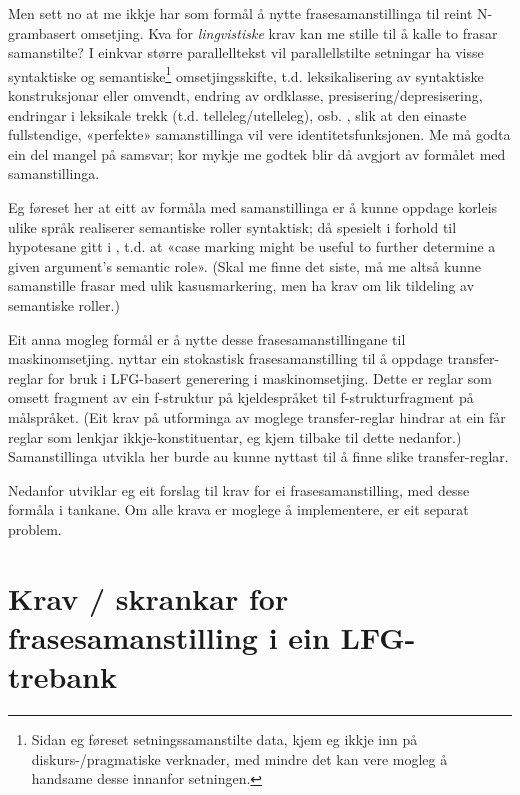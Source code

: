 \documentclass[11pt,a4paper,oneside,draft]{book}
\begin{document}
Men sett no at me ikkje har som formål å nytte frasesamanstillinga til
reint N-grambasert omsetjing. Kva for \emph{lingvistiske} krav kan me stille
til å kalle to frasar samanstilte? I einkvar større parallelltekst vil
parallellstilte setningar ha visse syntaktiske og semantiske\footnote{Sidan eg føreset setningssamanstilte data, kjem eg ikkje inn på
 diskurs-/pragmatiske verknader, med mindre det kan vere mogleg
 å handsame desse innanfor setningen. }
omsetjingsskifte, t.d. leksikalisering av syntaktiske konstruksjonar
eller omvendt, endring av ordklasse, presisering/depresisering,
endringar i leksikale trekk (t.d. telleleg/utelleleg),
osb. \citep[s.~56--62]{munday2001its}, slik at den einaste
fullstendige, «perfekte» samanstillinga vil vere
identitetsfunksjonen. Me må godta ein del mangel på samsvar; kor mykje
me godtek blir då avgjort av formålet med samanstillinga.

Eg føreset her at eitt av formåla med samanstillinga er å kunne
oppdage korleis ulike språk realiserer semantiske roller syntaktisk;
då spesielt i forhold til hypotesane gitt i \citet[s.~7]{xpar2008rcn},
t.d. at «case marking might be useful to further determine a given
argument's semantic role». (Skal me finne det siste, må me altså kunne
samanstille frasar med ulik kasusmarkering, men ha krav om lik
tildeling av semantiske roller.)

Eit anna mogleg formål er å nytte desse frasesamanstillingane til
maskinomsetjing. \citet{riezler2006gmt} nyttar ein stokastisk
frasesamanstilling til å oppdage transfer-reglar for bruk i LFG-basert
generering i maskinomsetjing. Dette er reglar som omsett fragment av
ein f-struktur på kjeldespråket til f-strukturfragment på
målspråket. (Eit krav på utforminga av moglege transfer-reglar hindrar
at ein får reglar som lenkjar ikkje-konstituentar, eg kjem tilbake til
dette nedanfor.)  Samanstillinga utvikla her burde au kunne nyttast
til å finne slike transfer-reglar.

Nedanfor utviklar eg eit forslag til krav for ei frasesamanstilling,
med desse formåla i tankane. Om alle krava er moglege å implementere,
er eit separat problem.

\section{Krav / skrankar for frasesamanstilling i ein LFG-trebank}
\label{sec-3.4}
\end{document}
